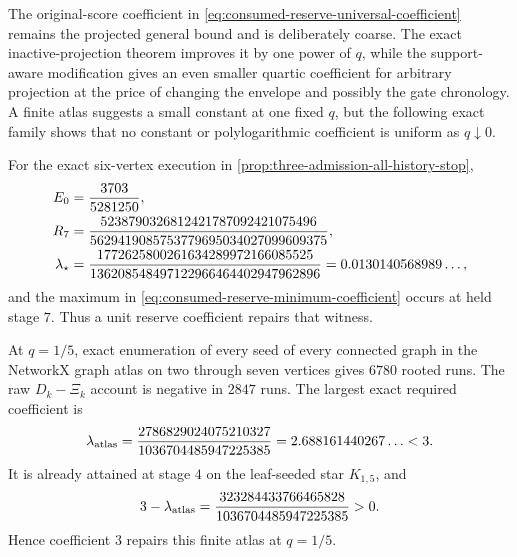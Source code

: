 The original-score coefficient in
\cref{eq:consumed-reserve-universal-coefficient} remains the projected general
bound and is deliberately coarse.  The exact inactive-projection theorem
improves it by one power of $q$, while the support-aware modification gives
an even smaller quartic coefficient for arbitrary projection at the price of
changing the envelope and possibly the gate chronology.  A finite atlas suggests a small
constant at one fixed $q$, but the following exact family shows that no
constant or polylogarithmic coefficient is uniform as $q\downarrow0$.

\begin{proposition}
\label{prop:consumed-energy-star-stop}
For the exact six-vertex execution in
\cref{prop:three-admission-all-history-stop},
\begin{align}
 E_0&=\frac{3703}{5281250},\notag\\
 R_7&=
 \frac{5238790326812421787092421075496}
 {5629419085753779695034027099609375},
 \label{eq:three-admission-consumed-reserve}\\
 \lambda_\star
 &=\frac{1772625800261634289972166085525}
 {136208548497122966464402947962896}
 =0.0130140568989\ldots,
 \label{eq:three-admission-reserve-minimum}
\end{align}
and the maximum in
\cref{eq:consumed-reserve-minimum-coefficient} occurs at held stage $7$.
Thus a unit reserve coefficient repairs that witness.

At $q=1/5$, exact enumeration of every seed of every connected graph in the
NetworkX graph atlas on two through seven vertices gives $6780$ rooted runs.
The raw $D_k-\Xi_k$ account is negative in $2847$ runs.  The largest exact
required coefficient is
\begin{equation}
 \lambda_{\rm atlas}
 =\frac{2786829024075210327}{1036704485947225385}
 =2.688161440267\ldots<3.
 \label{eq:consumed-reserve-atlas-maximum}
\end{equation}
It is already attained at stage $4$ on the leaf-seeded star $K_{1,5}$, and
\begin{equation*}
 3-\lambda_{\rm atlas}
 =\frac{323284433766465828}{1036704485947225385}>0.
\end{equation*}
Hence coefficient $3$ repairs this finite atlas at $q=1/5$.


\end{proposition}
